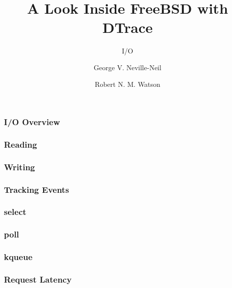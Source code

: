 \documentclass[pdftex]{beamer}
\begin{document}

\title{A Look Inside FreeBSD with DTrace}
\subtitle{I/O}
\author[shortname]{George V. Neville-Neil \and Robert N. M. Watson}

\begin{frame}
  \frametitle{I/O Overview}
  
\end{frame}

\begin{frame}
  \frametitle{Reading}
  
\end{frame}

\begin{frame}
  \frametitle{Writing}
  
\end{frame}

\begin{frame}
  \frametitle{Tracking Events}
  
\end{frame}

\begin{frame}
  \frametitle{select}
  
\end{frame}

\begin{frame}
  \frametitle{poll}
  
\end{frame}

\begin{frame}
  \frametitle{kqueue}
  
\end{frame}

\begin{frame}
  \frametitle{Request Latency}
  
\end{frame}


\end{document}
